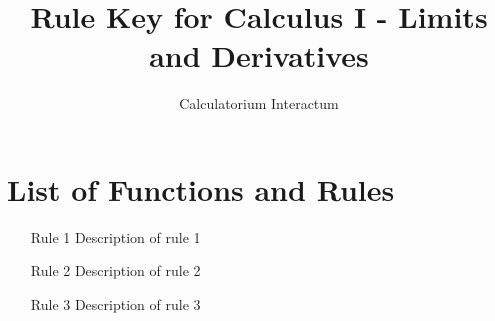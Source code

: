 \documentclass{article}
\title{Rule Key for Calculus I - Limits and Derivatives}
\author{Calculatorium Interactum}
\begin{document}
\maketitle

\section{List of Functions and Rules}

\begin{enumerate}
    \item [Rule 1] Description of rule 1
    \item [Rule 2] Description of rule 2
    \item [Rule 3] Description of rule 3
\end{enumerate}
\end{document}
